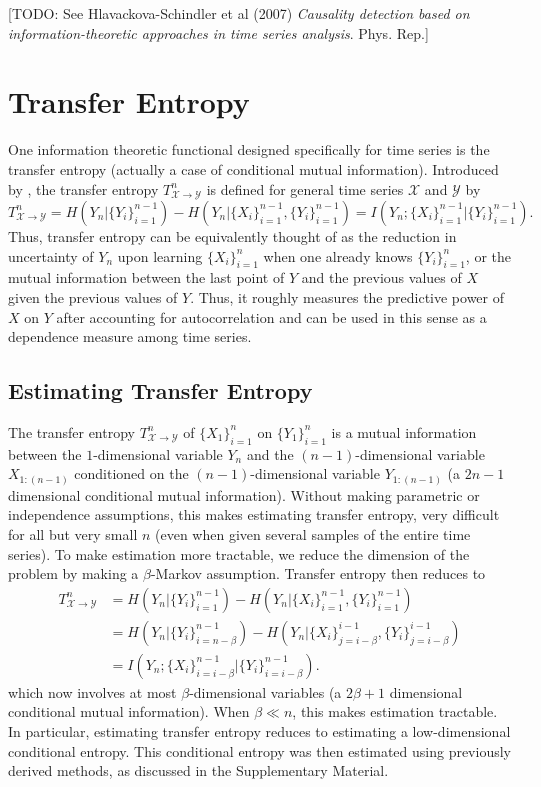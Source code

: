 \documentclass{article} %
\newcommand{\X}{\mathcal{X}}                        %
\newcommand{\Y}{\mathcal{Y}}                        %
\begin{document}
[TODO: See Hlavackova-Schindler et al (2007) \emph{Causality detection based
on information-theoretic approaches in time series analysis}. Phys. Rep.]

\section{Transfer Entropy}
\label{sec:TE}
One information theoretic functional designed specifically for time series
is the transfer entropy (actually a case of conditional mutual information).
Introduced by \cite{schreiber00transferEntropy}, the transfer entropy
$T_{\X \to \Y}^n$ is defined for general time series $\X$ and $\Y$ by
\[T_{\X \to \Y}^n
    = H(Y_n | \{Y_i\}_{i = 1}^{n - 1}) - H(Y_n | \{X_i\}_{i = 1}^{n - 1}, \{Y_i\}_{i = 1}^{n - 1})
    = I(Y_n; \{X_i\}_{i = 1}^{n - 1} | \{Y_i\}_{i = 1}^{n - 1}).\]
Thus, transfer entropy can be equivalently thought of as the reduction in
uncertainty of $Y_n$ upon learning $\{X_i\}_{i = 1}^n$ when one already knows
$\{Y_i\}_{i = 1}^n$, or the mutual information between the last point of $Y$
and the previous values of $X$ given the previous values of $Y$. Thus, it
roughly measures the predictive power of $X$ on $Y$ after accounting for
autocorrelation and can be used in this sense as a dependence measure among
time series.

\subsection{Estimating Transfer Entropy}
The transfer entropy $T_{\X \to \Y}^n$ of $\{X_1\}_{i = 1}^n$ on
$\{Y_1\}_{i = 1}^n$ is a mutual information between the $1$-dimensional
variable $Y_n$ and the $(n - 1)$-dimensional variable $X_{1:(n - 1)}$
conditioned on the $(n - 1)$-dimensional variable $Y_{1:(n - 1)}$ (a $2n - 1$
dimensional conditional mutual information). Without making parametric or
independence assumptions, this makes estimating transfer entropy, very
difficult for all but very small $n$ (even when given several samples of the
entire time series). To make estimation more tractable, we reduce the dimension
of the problem by making a $\beta$-Markov assumption.
Transfer entropy then reduces to
\begin{align*}
T_{\X \to \Y}^n
 &  = H(Y_n | \{Y_i\}_{i = 1}^{n - 1})
        - H(Y_n | \{X_i\}_{i = 1}^{n - 1}, \{Y_i\}_{i = 1}^{n - 1}) \\
 &  = H(Y_n | \{Y_i\}_{i = n - \beta}^{n - 1})
        - H(Y_n | \{X_i\}_{j = i - \beta}^{i - 1}, \{Y_i\}_{j = i - \beta}^{i - 1}) \\
 &  = I(Y_n; \{X_i\}_{i = i - \beta}^{n - 1}
                                            | \{Y_i\}_{i = i - \beta}^{n - 1}).
\end{align*}
which now involves at most $\beta$-dimensional variables (a $2\beta + 1$
dimensional conditional mutual information). When $\beta \ll n$, this makes
estimation tractable. In particular, estimating transfer entropy reduces to
estimating a low-dimensional conditional entropy. This conditional entropy was
then estimated using previously derived methods, as discussed in the
Supplementary Material.
\end{document}
